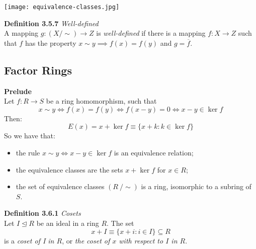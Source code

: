 \documentclass[8pt,landscape]{article}
\begin{document}
\begin{multicols}{3}
    \begin{center}{}
        \texttt{[image: equivalence-classes.jpg]}
    \end{center}

    \textbf{Definition 3.5.7} \emph{Well-defined} \\
    A mapping $g : (X/\sim) \to Z$ is \emph{well-defined} if there is a mapping
    $f : X \to Z$ such that $f$ has the property
    $x \sim y \implies f(x) = f(y)$ and $g = \overline{f}$.

    \subsection{Factor Rings}

    \textbf{Prelude} \\
    Let $f : R \to S$ be a ring homomorphism, such that
    \[
        x \sim y \iff f(x) = f(y) \iff f(x-y) = 0 \iff x - y \in \ker f
    \]
    Then:
    \[
        E(x) = x + \ker f \equiv \{x + k : k \in \ker f \}
    \]
    So we have that:
    \begin{itemize}
        \item the rule $x \sim y \iff x - y \in \ker f$ is an equivalence relation;
        \item the equivalence classes are the sets $x + \ker f$ for $x \in R$;
        \item the set of equivalence classes $(R \ / \sim)$ is a ring,
            isomorphic to a subring of $S$.
    \end{itemize}

    \textbf{Definition 3.6.1} \emph{Cosets} \\
    Let $I \trianglelefteq R$ be an ideal in a ring $R$.
    The set
    \[
        x+I \equiv \{x + i : i \in I\} \subseteq R
    \]
    is a \emph{coset of I in $R$}, or
    \emph{the coset of $x$ with respect to $I$ in $R$}.


\end{multicols}
\end{document}
